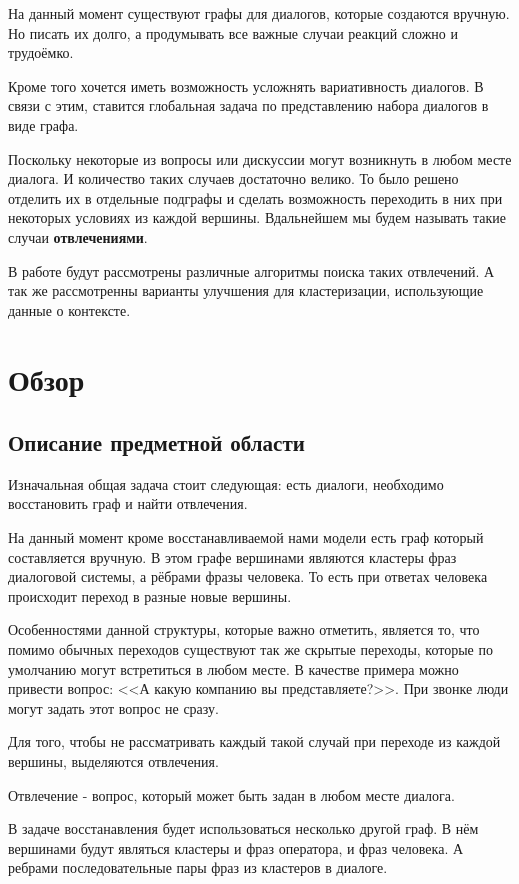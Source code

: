 \documentclass[specification,annotation]{itmo-student-thesis}
\begin{document}
	На данный момент существуют графы для диалогов, которые создаются вручную. Но писать их долго, а продумывать все важные случаи реакций сложно и трудоёмко. 
	
	Кроме того хочется иметь возможность усложнять вариативность диалогов. В связи с этим, ставится глобальная задача по представлению набора диалогов в виде графа. 
	
	Поскольку некоторые из вопросы или дискуссии могут возникнуть в любом месте диалога. И количество таких случаев достаточно велико. То было решено отделить их в отдельные подграфы и сделать возможность переходить в них при некоторых условиях из каждой вершины. Вдальнейшем мы будем называть такие случаи \textbf{отвлечениями}.
	
	В работе будут рассмотрены различные алгоритмы поиска таких отвлечений. А так же рассмотренны варианты улучшения для кластеризации, использующие данные о контексте.
	
	\chapter{Обзор}
	\section{Описание предметной области}
	Изначальная общая задача стоит следующая: есть диалоги, необходимо восстановить граф и найти отвлечения.
	
	На данный момент кроме восстанавливаемой нами модели есть граф который составляется вручную. В этом графе вершинами являются кластеры фраз диалоговой системы, а рёбрами фразы человека. То есть при ответах человека происходит переход в разные новые вершины.
	
	Особенностями данной структуры, которые важно отметить, является то, что помимо обычных переходов существуют так же скрытые переходы, которые по умолчанию могут встретиться в любом месте. В качестве примера можно привести вопрос: <<А какую компанию вы представляете?>>. При звонке люди могут задать этот вопрос не сразу.
	
	Для того, чтобы не рассматривать каждый такой случай при переходе из каждой вершины, выделяются $\textbf{отвлечения}$. 
	
	$\textbf{Отвлечение}$ - вопрос, который может быть задан в любом месте диалога. 
	
	В задаче восстанавления будет использоваться несколько другой граф. В нём вершинами будут являться кластеры и фраз оператора, и фраз человека. А ребрами последовательные пары фраз из кластеров в диалоге.
	
\end{document}
